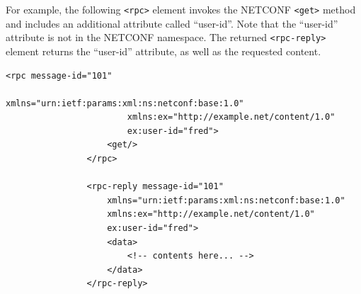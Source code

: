 For example, the following \texttt{<rpc>} element invokes the NETCONF \texttt{<get>} method and includes an additional attribute called ``user-id''.  Note that the ``user-id'' attribute is not in the NETCONF namespace.  The returned \texttt{<rpc-reply>} element returns the ``user-id'' attribute, as well as the requested content.

\begin{lstlisting}[style=xmlStyle, caption={\texttt{<rpc-reply>} \texttt{<get>} Model.}, backgroundcolor=\color{codebackground}]
                <rpc message-id="101"
                        xmlns="urn:ietf:params:xml:ns:netconf:base:1.0"
                        xmlns:ex="http://example.net/content/1.0"
                        ex:user-id="fred">
                    <get/>
                </rpc>

                <rpc-reply message-id="101"
                    xmlns="urn:ietf:params:xml:ns:netconf:base:1.0"
                    xmlns:ex="http://example.net/content/1.0"
                    ex:user-id="fred">
                    <data>
                        <!-- contents here... -->
                    </data>
                </rpc-reply>         
\end{lstlisting}



